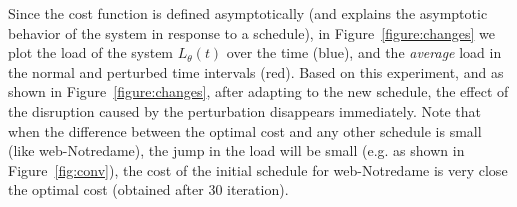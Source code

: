 Since the cost function is defined asymptotically (and explains the asymptotic behavior of the system in response to a schedule), in  Figure~\ref{figure:changes} we plot the load of the system $L_\theta(t)$ over the time (blue), and the \emph{average} load in the normal and perturbed time intervals (red). Based on this experiment, and as shown in Figure~\ref{figure:changes}, after adapting to the new schedule, the effect of the disruption caused by the perturbation disappears immediately. Note that when the difference between the optimal cost and any other schedule is small (like web-Notredame), the jump in the load will be small (e.g. as shown in Figure~\ref{fig:conv}), the cost of the initial schedule for web-Notredame is very close the optimal cost (obtained after 30 iteration).





